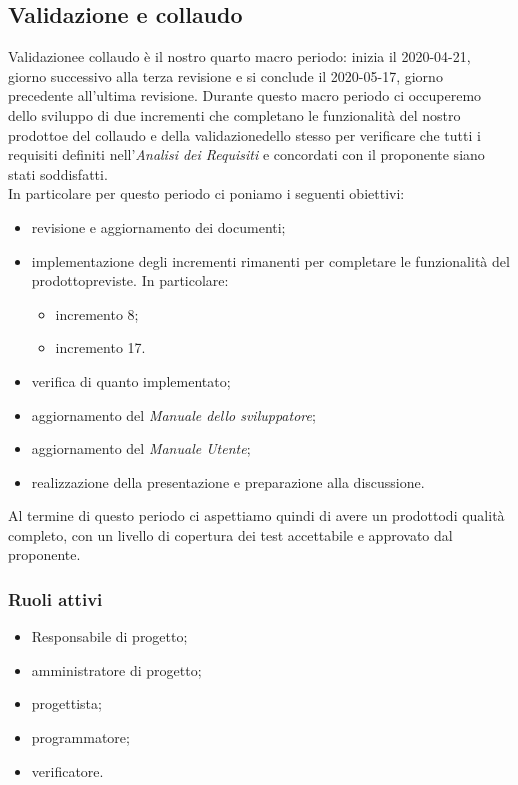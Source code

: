 \subsection{Validazione e collaudo}
Validazione\glosp e collaudo è il nostro quarto macro periodo: inizia il 2020-04-21, giorno successivo alla terza revisione e si conclude il 2020-05-17, giorno precedente all'ultima revisione. Durante questo macro periodo ci occuperemo dello sviluppo di due incrementi che completano le funzionalità del nostro prodotto\glosp e del collaudo e della validazione\glosp dello stesso per verificare che tutti i requisiti definiti nell'\textit{Analisi dei Requisiti} e concordati con il proponente siano stati soddisfatti. \\
In particolare per questo periodo ci poniamo i seguenti obiettivi:
\begin{itemize}
	\item revisione e aggiornamento dei documenti;	
	\item implementazione degli incrementi rimanenti per completare le funzionalità del prodotto\glosp previste. In particolare:
		\begin{itemize}
			\item incremento 8;
			\item incremento 17.
		\end{itemize}
	\item verifica di quanto implementato;
	\item aggiornamento del \textit{Manuale dello sviluppatore};
	\item aggiornamento del \textit{Manuale Utente};
	\item realizzazione della presentazione e preparazione alla discussione.	
\end{itemize}
Al termine di questo periodo ci aspettiamo quindi di avere un prodotto\glosp di qualità completo, con un livello di copertura dei test accettabile e approvato dal proponente. 

\subsubsection*{Ruoli attivi}
\begin{itemize}
	\item Responsabile di progetto\glo;
	\item amministratore di progetto\glo;
	\item progettista;
	\item programmatore;
	\item verificatore.
\end{itemize}

